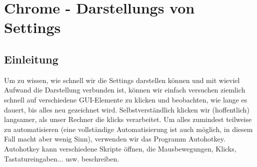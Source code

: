 \documentclass[qualitaetssicherung.tex]{subfiles}
\begin{document}
\section{Chrome - Darstellungs von Settings}
	\subsection{Einleitung}
	Um zu wissen, wie schnell wir die Settings darstellen können und mit wieviel Aufwand die Darstellung verbunden ist, können wir einfach versuchen ziemlich schnell auf verschiedene GUI-Elemente zu klicken und beobachten, wie lange es dauert, bis alles neu gezeichnet wird. Selbstverständlich klicken wir (hoffentlich) langsamer, als unser Rechner die klicks verarbeitet. Um alles zumindest teilweise zu automatisieren (eine vollständige Automatisierung ist auch möglich, in diesem Fall macht aber wenig Sinn), verwenden wir das Programm Autohotkey. Autohotkey kann verschiedene Skripte öffnen, die Mausbewegungen, Klicks, Tastatureingaben... usw. beschreiben.
\end{document}
